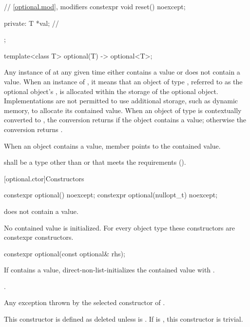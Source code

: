 \begin{codeblock}
{{    // \ref{optional.mod}, modifiers
    constexpr void reset() noexcept;

  private:
    T *val;         // \expos
  };

  template<class T>
    optional(T) -> optional<T>;
}
\end{codeblock}

\pnum
Any instance of  at any given time either contains a value or does not contain a value.
When an instance of  ,
it means that an object of type , referred to as the optional object's ,
is allocated within the storage of the optional object.
Implementations are not permitted to use additional storage, such as dynamic memory, to allocate its contained value.
When an object of type  is contextually converted to ,
the conversion returns  if the object contains a value;
otherwise the conversion returns .

\pnum
When an  object contains a value,
member  points to the contained value.

\pnum
{} shall be a type
other than \cv{}  or \cv{} 
that meets the  requirements ().

[optional.ctor]{Constructors}

%
\begin{itemdecl}
constexpr optional() noexcept;
constexpr optional(nullopt_t) noexcept;
\end{itemdecl}

\begin{itemdescr}
\pnum
\ensures
{} does not contain a value.

\pnum
\remarks
No contained value is initialized.
For every object type  these constructors are constexpr constructors.
\end{itemdescr}

%
\begin{itemdecl}
constexpr optional(const optional& rhs);
\end{itemdecl}

\begin{itemdescr}
\pnum
\effects
If  contains a value, direct-non-list-initializes the contained value
with .

\pnum
\ensures
{}.

\pnum
\throws
Any exception thrown by the selected constructor of .

\pnum
\remarks
This constructor is defined as deleted unless
 is .
If  is ,
this constructor is trivial.
\end{itemdescr}

